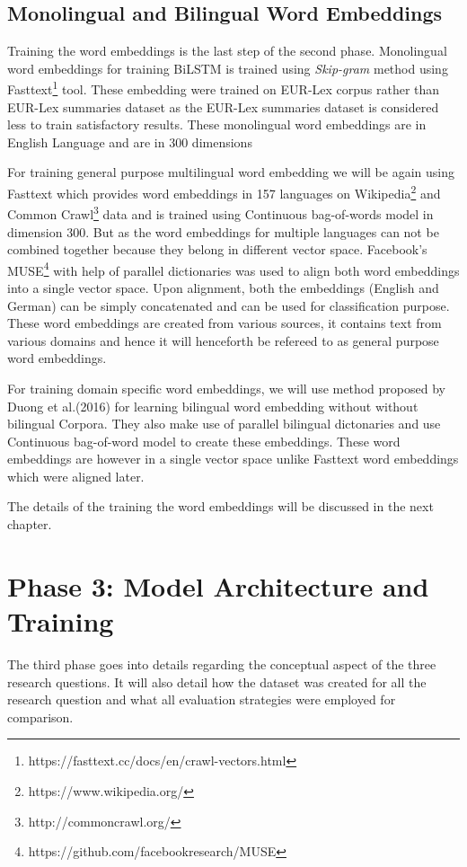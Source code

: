 \subsection*{Monolingual and Bilingual Word Embeddings}

Training the word embeddings is the last step of the second phase. Monolingual word embeddings for training \gls{BiLSTM} is trained using \textit{Skip-gram} method using Fasttext\footnote{https://fasttext.cc/docs/en/crawl-vectors.html}\cite{graves2009novel} tool. These embedding were trained on EUR-Lex corpus rather than EUR-Lex summaries dataset as the EUR-Lex summaries dataset is considered less to train satisfactory results. These monolingual word embeddings are in English Language and are in 300 dimensions

For training general purpose multilingual word embedding we will be again using Fasttext which provides word embeddings in 157 languages on Wikipedia\footnote{https://www.wikipedia.org/} and Common Crawl\footnote{http://commoncrawl.org/} data and is trained using Continuous bag-of-words model in dimension 300. But as the word embeddings for multiple languages can not be combined together because they belong in different vector space. Facebook's MUSE\footnote{https://github.com/facebookresearch/MUSE} \cite{conneau2017word} with help of parallel dictionaries was used to align both word embeddings into a single vector space. Upon alignment, both the embeddings (English and German) can be simply concatenated and can be used for classification purpose. These word embeddings are created from various sources, it contains text from various domains and hence it will henceforth be refereed to as general purpose word embeddings.

For training domain specific word embeddings, we will use method proposed by Duong et al.(2016)\cite{duong-EtAl:2016:EMNLP} for learning bilingual word embedding without without bilingual Corpora. They also make use of parallel bilingual dictonaries and use Continuous bag-of-word model to create these embeddings. These word embeddings are however in a single vector space unlike Fasttext word embeddings which were aligned later.

The details of the training the word embeddings will be discussed in the next chapter.

\section{Phase 3: Model Architecture and Training}\label{sec:conceptRQ}
The third phase goes into details regarding the conceptual aspect of the three research questions. It will also detail how the dataset was created for all the research question and what all evaluation strategies were employed for comparison. 



